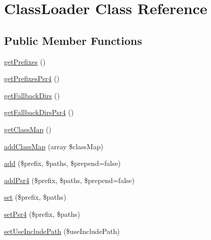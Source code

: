 \hypertarget{class_composer_1_1_autoload_1_1_class_loader}{}\section{Class\+Loader Class Reference}
\label{class_composer_1_1_autoload_1_1_class_loader}
\subsection*{Public Member Functions}
\begin{DoxyCompactItemize}
\item 
\mbox{\hyperlink{class_composer_1_1_autoload_1_1_class_loader_a102069675f7a94f8917f44acc2390687}{get\+Prefixes}} ()
\item 
\mbox{\hyperlink{class_composer_1_1_autoload_1_1_class_loader_aa51c60813356de68739dbc9047976ceb}{get\+Prefixes\+Psr4}} ()
\item 
\mbox{\hyperlink{class_composer_1_1_autoload_1_1_class_loader_ae15bf208c8df574932ed0db749d5447b}{get\+Fallback\+Dirs}} ()
\item 
\mbox{\hyperlink{class_composer_1_1_autoload_1_1_class_loader_a1f1f85b44a8d01987ad2b6cd78f268bd}{get\+Fallback\+Dirs\+Psr4}} ()
\item 
\mbox{\hyperlink{class_composer_1_1_autoload_1_1_class_loader_a7e9a9730c400820ee2b1c995cd5134fe}{get\+Class\+Map}} ()
\item 
\mbox{\hyperlink{class_composer_1_1_autoload_1_1_class_loader_a164966b8bcb9bf5470152bb5707a28af}{add\+Class\+Map}} (array \$class\+Map)
\item 
\mbox{\hyperlink{class_composer_1_1_autoload_1_1_class_loader_a5c0f76dc6dde6d1209d78b2fa27db0af}{add}} (\$prefix, \$paths, \$prepend=false)
\item 
\mbox{\hyperlink{class_composer_1_1_autoload_1_1_class_loader_a264d8845526646ebc3725f219949baca}{add\+Psr4}} (\$prefix, \$paths, \$prepend=false)
\item 
\mbox{\hyperlink{class_composer_1_1_autoload_1_1_class_loader_a558e395314f41f94b501b189ae74dcae}{set}} (\$prefix, \$paths)
\item 
\mbox{\hyperlink{class_composer_1_1_autoload_1_1_class_loader_a7f92172519c08357430e7da877a88995}{set\+Psr4}} (\$prefix, \$paths)
\item 
\mbox{\hyperlink{class_composer_1_1_autoload_1_1_class_loader_aed3e96782322ebc7352f1e62de1cc38c}{set\+Use\+Include\+Path}} (\$use\+Include\+Path)
\item 

\end{DoxyCompactItemize}
